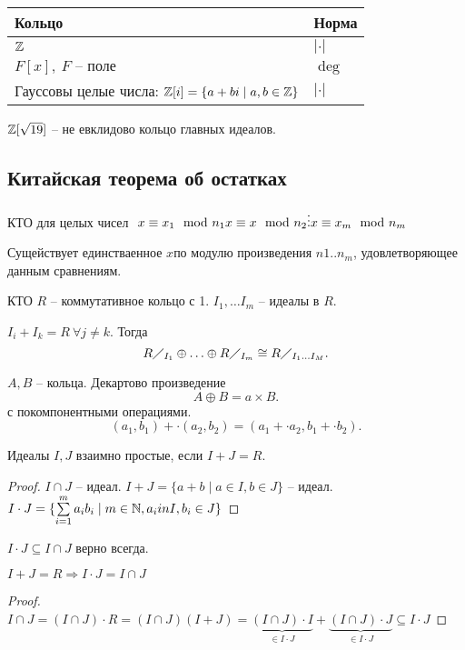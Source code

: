 \documentclass[12pt]{report}
\begin{document}
\begin{exs}
    \begin{tabular}[ht]{l|l}
	Кольцо & Норма\\
	\hline
	$ \mathbb{Z}$ &$ |\cdot|$\\
	$ F[x], ~ F \text{ -- поле}$ & $  \deg$\\
	Гауссовы целые числа: $ \mathbb{Z}[i] = \{a + bi \mid a, b \in\mathbb{Z}\}$ & $ |\cdot|$
    \end{tabular}
\end{exs}
\begin{ex}
    $ \mathbb{Z} [\sqrt{19}]$ -- не евклидово кольцо главных идеалов. 
\end{ex}
\subsection{Китайская теорема об остатках}
\begin{thm}{КТО для целых чисел} $ $
    $ x \equiv x_1 \mod n_1 \\
    x \equiv x \mod n_2 \\
    \vdots \\
    x  \equiv x_m \mod n_m$ 

    Сущействует единстваенное  $ x$по модулю произведения $ n1 .. n_m$, удовлетворяющее данным сравнениям.
\end{thm}
\begin{thm}{КТО}
    $ R$ -- коммутативное кольцо с 1.
    $ I_1, \ldots I_m$ -- идеалы в $ R$.

$ I_i + I_k = R ~ \forall  j \ne k$.
Тогда \[
    R\diagup _{I_1} \oplus \ldots  \oplus R\diagup _{I_m} \cong R \diagup _{I_1 \ldots I_M}
.\] 
\end{thm}
\begin{rem}
    $ A, B$ -- кольца. Декартово произведение \[
    A \oplus B = a \times  B
    .\] 
    с покомпонентными операциями.
    \[
	(a_1, b_1) + \cdot (a_2, b_2) = (a_1 + \cdot a_2, b_1 +\cdot b_2)
    .\] 
\end{rem}
\begin{st}
    Идеалы $ I, J$ взаимно простые, если $ I + J = R$.
\end{st}
\begin{proof}
    $ I \cap  J $ -- идеал.
    $ I + J = \{a + b \mid a \in I, b \in J\}$ -- идеал.
    $ I \cdot J = \{\sum\limits _{i=1} ^{m} a_i b_i \mid m \in  \mathbb{N}, a_i in I, b_i \in  J\}$
\end{proof}
\begin{lm}
   $I \cdot J \subseteq I \cap J$  верно всегда.
\end{lm}
\begin{lm}
    $ I + J = R \Longrightarrow I \cdot J = I \cap  J$
\end{lm}
\begin{proof}
    $ I \cap  J = (I \cap  J) \cdot R = (I \cap  J) (I + J) = \underbrace{(I \cap  J) \cdot I}_{ \in I \cdot J} + \underbrace{(I \cap J) \cdot J}_{ \in I \cdot J} \subseteq I \cdot J$
\end{proof}
\end{document}
